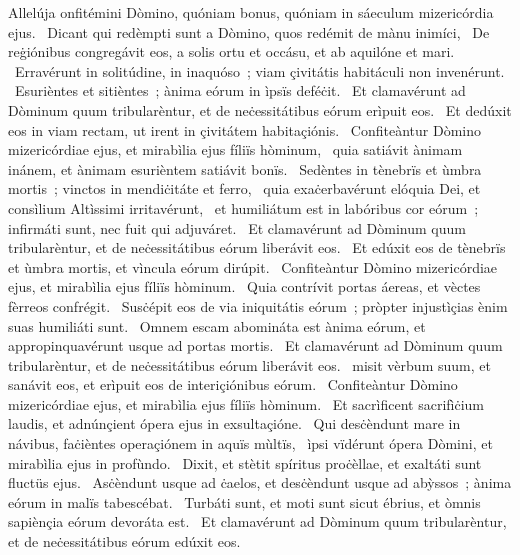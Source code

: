 { Allelúja}
{%
onfitémini Dòmino, quóniam bonus, quóniam in sáeculum mizericórdia ejus. 
~Dicant qui redèmpti sunt a Dòmino, quos redémit de mànu inimíci, 
~De reġiónibus congregávit eos, a solis ortu et occásu, et ab aquilóne et mari. 
~Erravérunt in solitúdine, in inaquóso~; viam çivitátis habitáculi non invenérunt. 
~Esurièntes et sitièntes~; ànima eórum in ìpsïs deféċit. 
~Et clamavérunt ad Dòminum quum tribularèntur, et de neċessitátibus eórum erìpuit eos. 
~Et dedúxit eos in viam rectam, ut irent in çivitátem habitaçiónis. 
~Confiteàntur Dòmino mizericórdiae ejus, et mirabìlia ejus fíliïs hòminum, 
~quia satiávit ànimam inánem, et ànimam esurièntem satiávit bonïs. 
~Sedèntes in tènebrïs et ùmbra mortis~; vinctos in mendiċitáte et ferro, 
~quia exaċerbavérunt elóquia Dei, et consìlium Altìssimi irritavérunt, 
~et humiliátum est in labóribus cor eórum~; infirmáti sunt, nec fuit qui adjuváret. 
~Et clamavérunt ad Dòminum quum tribularèntur, et de neċessitátibus eórum liberávit eos. 
~Et edúxit eos de tènebrïs et ùmbra mortis, et vìncula eórum dirúpit. 
~Confiteàntur Dòmino mizericórdiae ejus, et mirabìlia ejus fíliïs hòminum. 
~Quia contrívit portas áereas, et vèctes fèrreos confrégit. 
~Susċépit eos de via iniquitátis eórum~; pròpter injustìçias ènim suas humiliáti sunt. 
~Omnem escam abomináta est ànima eórum, et appropinquavérunt usque ad portas mortis. 
~Et clamavérunt ad Dòminum quum tribularèntur, et de neċessitátibus eórum liberávit eos. 
~misit vèrbum suum, et sanávit eos, et erìpuit eos de interiçiónibus eórum. 
~Confiteàntur Dòmino mizericórdiae ejus, et mirabìlia ejus fíliïs hòminum. 
~Et sacrìficent sacrifìċium laudis, et adnúnçient ópera ejus in exsultaçióne. 
~Qui desċèndunt mare in návibus, faċièntes operaçiónem in aquïs mùltïs, 
~ìpsi vïdérunt ópera Dòmini, et mirabìlia ejus in profùndo. 
~Dixit, et stètit spíritus proċèllae, et exaltáti sunt fluctüs ejus. 
~Asċèndunt usque ad ċaelos, et desċèndunt usque ad abỳssos~; ànima eórum in malïs tabescébat. 
~Turbáti sunt, et moti sunt sicut ébrius, et òmnis sapiènçia eórum devoráta est. 
~Et clamavérunt ad Dòminum quum tribularèntur, et de neċessitátibus eórum edúxit eos. 
}
